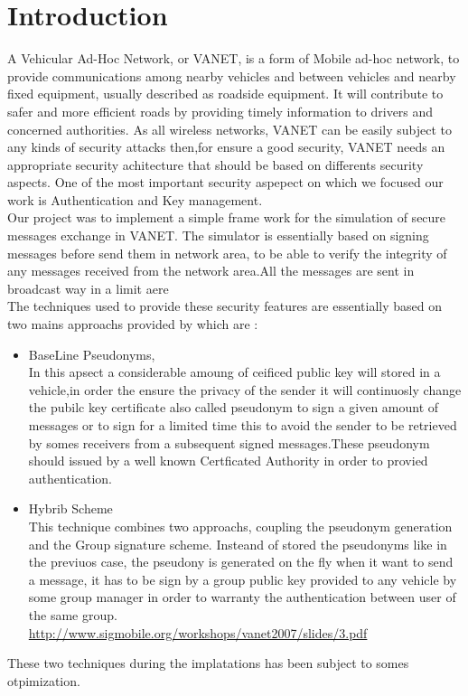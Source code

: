 \section{Introduction}
A Vehicular Ad-Hoc Network, or VANET, is a form of Mobile ad-hoc network, to provide communications among nearby vehicles and between vehicles and nearby fixed equipment, usually described as roadside equipment. It will contribute to safer and more efficient roads by providing timely information to drivers and concerned authorities.
As all wireless networks, VANET can be easily subject to any kinds of security  attacks then,for ensure a good security, VANET needs an appropriate security achitecture that should be based on differents security aspects. One of the most important security aspepect on which we focused our work is Authentication and Key management.\\
Our project was to implement a simple frame work for the simulation of secure messages exchange in VANET. The simulator is essentially based on  signing  messages before send them in network area, to be able to verify the integrity of any messages received from the network area.All the messages are sent in broadcast way in a limit aere\\
The techniques used to provide these security features are essentially based on two mains approachs provided by\cite{calandriello} which are :
\begin{itemize}
\item BaseLine Pseudonyms,\\
In this apsect a considerable amoung of ceificed public key will stored in a vehicle,in order the ensure the privacy of the sender it will continuosly change the pubilc key certificate also called pseudonym to sign a given amount of messages or to sign for a limited time this to avoid the sender to be retrieved by somes receivers from a subsequent signed messages.These pseudonym should issued by a well known Certficated Authority in order to provied authentication.

\item Hybrib Scheme\\
This technique combines two approachs, coupling the pseudonym generation and the Group signature scheme.
Insteand of stored the pseudonyms like in the previuos case, the pseudony is generated on the fly when it want to send a message, it has to be sign by a group public key provided to any vehicle by some group manager in order to warranty the authentication between user of the same group. 
\\
\url{http://www.sigmobile.org/workshops/vanet2007/slides/3.pdf}
\end{itemize}
These two techniques during the implatations has been subject to somes otpimization.
\\
\\